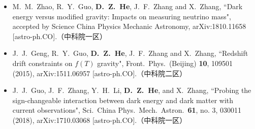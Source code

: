 \begin{itemize}[leftmargin=*]
    \item  M.~M.~Zhao, R.~Y.~Guo, \textbf{D.~Z.~He}, J.~F.~Zhang and X.~Zhang, ``Dark energy versus modified gravity: Impacts on measuring neutrino mass", accepted by Science China Physics Mechanic Astronomy, arXiv:1810.11658 [astro-ph.CO].（中科院一区）
 
    \item J.~J.~Geng, R.~Y.~Guo, \textbf{D.~Z.~He}, J.~F.~Zhang and X.~Zhang, ``Redshift drift constraints on $f(T)$ gravity", Front.\ Phys.\ (Beijing) {\bf 10}, 109501      (2015), arXiv:1511.06957 [astro-ph.CO].（中科院二区）
  
    \item J.~J.~Guo, J.~F.~Zhang, Y.~H.~Li, \textbf{D.~Z.~He}, and X.~Zhang, ``Probing the sign-changeable interaction between dark energy and dark matter with current observations", Sci.\ China Phys.\ Mech.\ Astron.\ {\bf 61}, no. 3, 030011 (2018), arXiv:1710.03068 [astro-ph.CO].（中科院一区）
    
  \end{itemize}